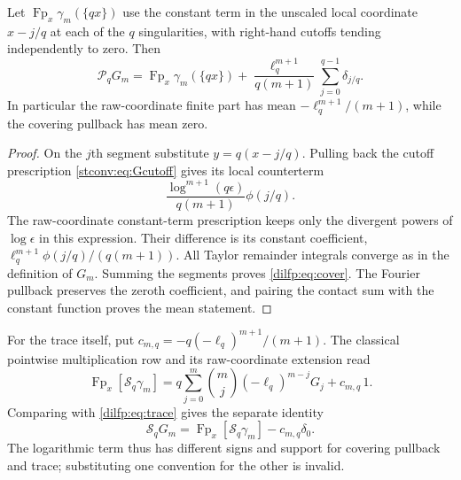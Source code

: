\begin{theorem}
\label{dilfp:thm:cover}
Let $\operatorname{Fp}_x\gamma_m(\{qx\})$ use the constant term in
the unscaled local coordinate $x-j/q$ at each of the $q$ singularities,
with right-hand cutoffs tending independently to zero. Then
\begin{equation}\label{dilfp:eq:cover}
 \mathcal P_qG_m
 =\operatorname{Fp}_x\gamma_m(\{qx\})
 +\frac{\ell_q^{m+1}}{q(m+1)}
                    \sum_{j=0}^{q-1}\delta_{j/q}.
\end{equation}
In particular the raw-coordinate finite part has mean
$-\ell_q^{m+1}/(m+1)$, while the covering pullback has mean zero.
\end{theorem}
\begin{proof}
On the $j$th segment substitute $y=q(x-j/q)$. Pulling back the
cutoff prescription \eqref{stconv:eq:Gcutoff} gives its local
counterterm
\[
 \frac{\log^{m+1}(q\epsilon)}{q(m+1)}\phi(j/q).
\]
The raw-coordinate constant-term prescription keeps only the divergent
powers of $\log\epsilon$ in this expression. Their difference is its
constant coefficient, $\ell_q^{m+1}\phi(j/q)/(q(m+1))$.
All Taylor remainder integrals converge as in the definition of $G_m$.
Summing the segments proves \eqref{dilfp:eq:cover}. The Fourier
pullback preserves the zeroth coefficient, and pairing the contact sum
with the constant function proves the mean statement.
\end{proof}

For the trace itself, put $c_{m,q}=-q(-\ell_q)^{m+1}/(m+1)$.
The classical pointwise multiplication row and its raw-coordinate
extension read
\[
 \operatorname{Fp}_x[\mathcal S_q\gamma_m]
 =q\sum_{j=0}^m\binom mj(-\ell_q)^{m-j}G_j+c_{m,q}\,1.
\]
Comparing with \eqref{dilfp:eq:trace} gives the separate identity
\begin{equation}\label{dilfp:eq:trace-commutator}
 \mathcal S_qG_m
 =\operatorname{Fp}_x[\mathcal S_q\gamma_m]-c_{m,q}\delta_0.
\end{equation}
The logarithmic term thus has different signs and support for covering
pullback and trace; substituting one convention for the other is invalid.

